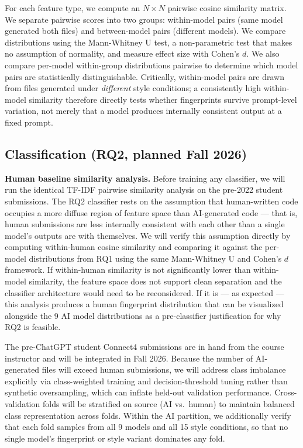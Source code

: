 \documentclass[sigconf]{acmart}
\begin{document}
For each feature type, we compute an $N \times N$ pairwise cosine similarity matrix. We separate pairwise scores into two groups: within-model pairs (same model generated both files) and between-model pairs (different models). We compare distributions using the Mann-Whitney U test, a non-parametric test that makes no assumption of normality, and measure effect size with Cohen's $d$. We also compare per-model within-group distributions pairwise to determine which model pairs are statistically distinguishable. Critically, within-model pairs are drawn from files generated under \emph{different} style conditions; a consistently high within-model similarity therefore directly tests whether fingerprints survive prompt-level variation, not merely that a model produces internally consistent output at a fixed prompt.

\subsection{Classification (RQ2, planned Fall 2026)}

\textbf{Human baseline similarity analysis.} Before training any classifier, we will run the identical TF-IDF pairwise similarity analysis on the pre-2022 student submissions. The RQ2 classifier rests on the assumption that human-written code occupies a more diffuse region of feature space than AI-generated code --- that is, human submissions are less internally consistent with each other than a single model's outputs are with themselves. We will verify this assumption directly by computing within-human cosine similarity and comparing it against the per-model distributions from RQ1 using the same Mann-Whitney U and Cohen's $d$ framework. If within-human similarity is not significantly lower than within-model similarity, the feature space does not support clean separation and the classifier architecture would need to be reconsidered. If it is --- as expected --- this analysis produces a human fingerprint distribution that can be visualized alongside the 9 AI model distributions as a pre-classifier justification for why RQ2 is feasible.

The pre-ChatGPT student Connect4 submissions are in hand from the course instructor and will be integrated in Fall 2026. Because the number of AI-generated files will exceed human submissions, we will address class imbalance explicitly via class-weighted training and decision-threshold tuning rather than synthetic oversampling, which can inflate held-out validation performance. Cross-validation folds will be stratified on source (AI vs.\ human) to maintain balanced class representation across folds. Within the AI partition, we additionally verify that each fold samples from all 9 models and all 15 style conditions, so that no single model's fingerprint or style variant dominates any fold.
\end{document}
